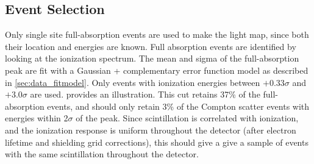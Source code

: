 \documentclass[herrin-thesis.tex]{subfiles}
\begin{document}
\subsection{Event Selection}
Only single site full-absorption events are used to make the light map, since both their location and energies are known. Full absorption events are identified by looking at the ionization spectrum. The mean and sigma of the full-absorption peak are fit with a Gaussian + complementary error function model as described in \cref{sec:data_fitmodel}. Only events with ionization energies between \(+0.33\sigma\) and \(+3.0\sigma\) are used.  provides an illustration. This cut retains 37\% of the full-absorption events, and should only retain 3\% of the Compton scatter events with energies within 2\(\sigma\) of the peak. Since scintillation is correlated with ionization, and the ionization response is uniform throughout the detector (after electron lifetime and shielding grid corrections), this should give a give a sample of events with the same scintillation throughout the detector.
\end{document}
